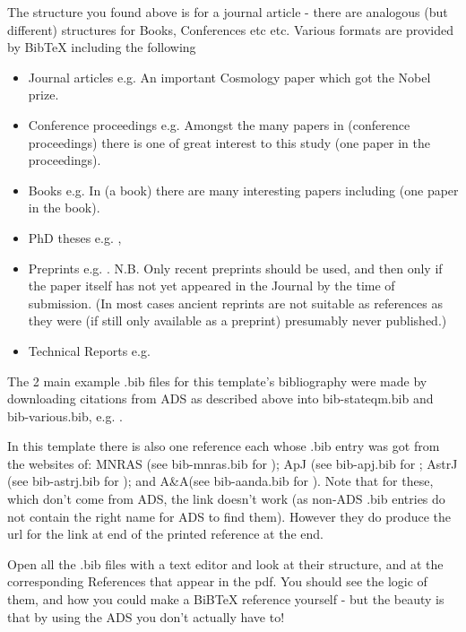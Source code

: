 \documentclass[twoside, fontsize=12pt,
     bibliography=totoc, %
     listof=totoc, %
     index=totoc, %
     onehalfspacing %
]{_MScDiss2017_cls}
\begin{document}
The structure you found above is for a journal article - there are analogous (but different) structures for Books, Conferences etc etc. 
Various formats are provided by BibTeX including the following  
\begin{itemize}{}
\item Journal articles e.g. An important Cosmology paper     which got the Nobel prize.
\item Conference proceedings e.g. Amongst the many papers in   (conference proceedings) there is one of great interest to this study  (one paper in the proceedings). 
\item Books e.g.  In   (a book) there are many interesting papers including   (one paper in the book).
\item PhD theses e.g. ,  
\item Preprints e.g. . N.B.  Only recent preprints should be used, and then only if the paper itself  has not yet appeared in the Journal by the time of submission. (In most cases ancient reprints are not suitable as references as they were (if still only available as a preprint) presumably never published.)
\item Technical Reports e.g. 
\end{itemize}

The 2 main example .bib files  for this template's bibliography were made by downloading citations from ADS as described above into bib-stateqm.bib and bib-various.bib, e.g.  . 

In this template there is also one reference each whose .bib entry was got from the websites of:  MNRAS (see bib-mnras.bib for ); ApJ (see bib-apj.bib for ; AstrJ (see bib-astrj.bib for ); and A\&A(see bib-aanda.bib for ). Note that for these, which don't come from ADS, the  link doesn't work (as non-ADS .bib entries  do not contain the right name for ADS to find them). However they do produce the url for the link at end of the printed reference at the end.

Open all the .bib files with a text editor and look at their structure, and at the corresponding References that appear in the pdf. You should see the logic of them, and how you could make a BiBTeX reference yourself - but the beauty is that by using the ADS you don't actually have to!
\end{document}
